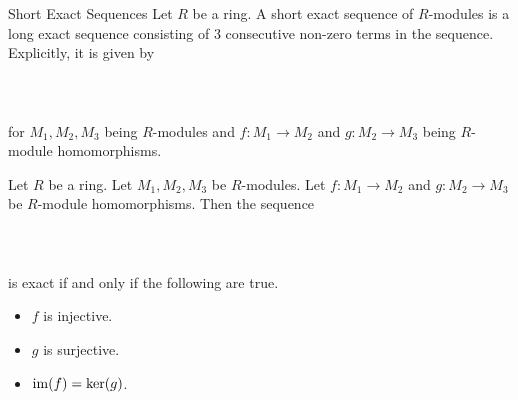 \documentclass[a4paper]{article}
\begin{document}
\begin{defn}{Short Exact Sequences}{} Let $R$ be a ring. A short exact sequence of $R$-modules is a long exact sequence consisting of $3$ consecutive non-zero terms in the sequence. Explicitly, it is given by \\~\\
\\~\\
for $M_1,M_2,M_3$ being $R$-modules and $f:M_1\to M_2$ and $g:M_2\to M_3$ being $R$-module homomorphisms. 
\end{defn}

\begin{lmm}{}{} Let $R$ be a ring. Let $M_1,M_2,M_3$ be $R$-modules. Let $f:M_1\to M_2$ and $g:M_2\to M_3$ be $R$-module homomorphisms. Then the sequence \\~\\
\\~\\
is exact if and only if the following are true. 
\begin{itemize}
\item $f$ is injective. 
\item $g$ is surjective. 
\item $\operatorname{im}(f)=\ker(g)$. 
\end{itemize}
\end{lmm}
\end{document}
